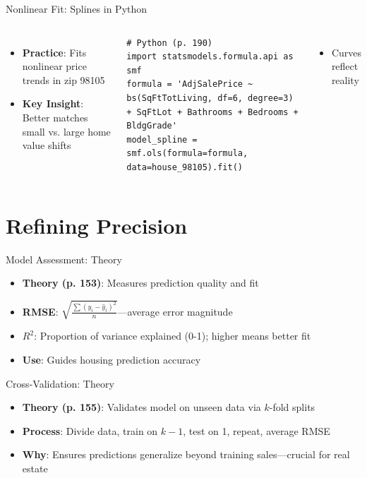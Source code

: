 \documentclass{beamer}
\begin{document}
	\begin{frame}[fragile]{Nonlinear Fit: Splines in Python}
		\lstset{language=Python}
		\begin{columns}
			\begin{itemize}
				\item \textbf{Practice}: Fits nonlinear price trends in zip 98105
				\item \textbf{Key Insight}: Better matches small vs. large home value shifts
			\end{itemize}
			\begin{lstlisting}
# Python (p. 190)
import statsmodels.formula.api as smf
formula = 'AdjSalePrice ~ bs(SqFtTotLiving, df=6, degree=3) + SqFtLot + Bathrooms + Bedrooms + BldgGrade'
model_spline = smf.ols(formula=formula, data=house_98105).fit()
			\end{lstlisting}
			\begin{itemize}
				\item Curves reflect reality
			\end{itemize}
		\end{columns}
	\end{frame}

	
	

	
	\section{Refining Precision}
	
	

	
	\begin{frame}{Model Assessment: Theory}
		\begin{itemize}
			\item \textbf{Theory (p. 153)}: Measures prediction quality and fit
			\item \textbf{RMSE}: $\sqrt{\frac{\sum (y_i - \hat{y}_i)^2}{n}}$—average error magnitude
			\item \textbf{$R^2$}: Proportion of variance explained (0-1); higher means better fit
			\item \textbf{Use}: Guides housing prediction accuracy
		\end{itemize}
	\end{frame}
	
	\begin{frame}{Cross-Validation: Theory}
		\begin{itemize}
			\item \textbf{Theory (p. 155)}: Validates model on unseen data via $k$-fold splits
			\item \textbf{Process}: Divide data, train on $k-1$, test on 1, repeat, average RMSE
			\item \textbf{Why}: Ensures predictions generalize beyond training sales—crucial for real estate
		\end{itemize}
	\end{frame}
	
\end{document}
